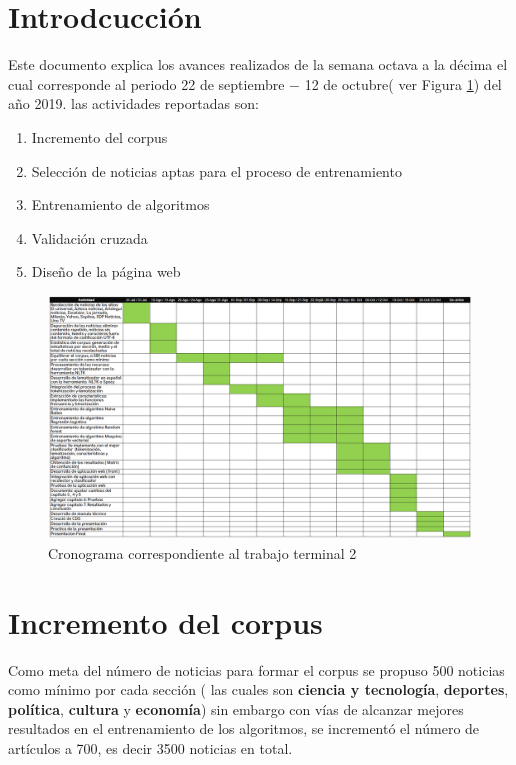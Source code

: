 \section{Introdcucción}

Este documento explica los avances realizados de la semana octava a  la décima el cual corresponde al periodo 22 de septiembre $-$ 12 de octubre( ver Figura \ref{fig:cronograma}) del año 2019. las actividades reportadas son:

\begin{enumerate}
	\item Incremento del corpus
	\item Selección de noticias aptas para el proceso de entrenamiento	
	\item Entrenamiento de algoritmos
	\item Validación cruzada
	\item Diseño de la página web
\end{enumerate} 

\begin{figure}[h]
\centering
\includegraphics[scale=0.4]{imagenes/Cronograma.png}
\caption{Cronograma correspondiente al trabajo terminal 2}
\label{fig:cronograma}
\end{figure}

\section{Incremento del corpus}

Como meta del número de noticias para formar el corpus se propuso 500 noticias como mínimo por cada sección ( las cuales son \textbf{ciencia y tecnología}, \textbf{deportes}, \textbf{política}, \textbf{cultura} y \textbf{economía}) sin embargo con vías de alcanzar mejores resultados en el entrenamiento de los algoritmos, se incrementó el número de artículos a 700, es decir 3500 noticias en total.\\

